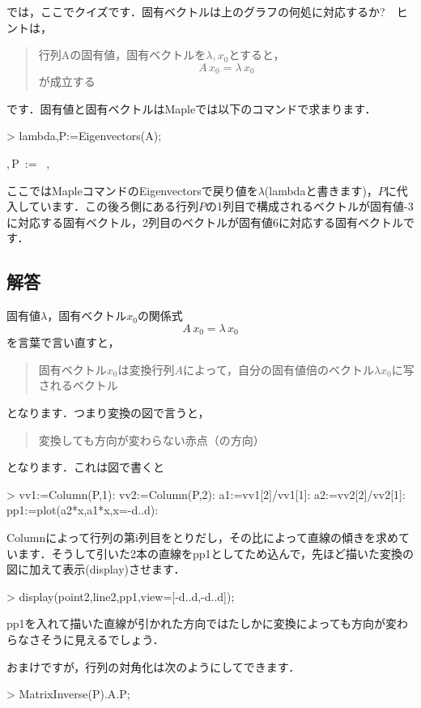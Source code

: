では，ここでクイズです．固有ベクトルは上のグラフの何処に対応するか?　ヒントは，
\begin{quotation}
行列Aの固有値，固有ベクトルを$\lambda, x_0$とすると，
\begin{equation*}
A \,x_0 = \lambda \, x_0
\end{equation*}
が成立する
\end{quotation}
です．固有値と固有ベクトルはMapleでは以下のコマンドで求まります．
\begin{MapleInput}
> lambda,P:=Eigenvectors(A);
\end{MapleInput}
\begin{MapleOutput}
\lambda,\,P\, := \, \left[ \begin {array}{c} -3\\6\end {array} \right] ,\, \left[ \begin {array}{cc} -1&5/4\\1&1\end {array} \right]
\end{MapleOutput}
ここではMapleコマンドのEigenvectorsで戻り値を$\lambda$(lambdaと書きます)，$P$に代入しています．この後ろ側にある行列$P$の1列目で構成されるベクトルが固有値-3に対応する固有ベクトル，2列目のベクトルが固有値6に対応する固有ベクトルです．

\subsection{解答}
固有値$\lambda$，固有ベクトル$x_0$の関係式
\begin{equation*}
A \,x_0 = \lambda \, x_0
\end{equation*}
を言葉で言い直すと，
\begin{quote}
固有ベクトル$x_0$は変換行列$A$によって，自分の固有値倍のベクトル$\lambda x_0$に写されるベクトル
\end{quote}
となります．つまり変換の図で言うと，
\begin{quote}
変換しても方向が変わらない赤点（の方向）
\end{quote}
となります．これは図で書くと
\begin{MapleInput}
> vv1:=Column(P,1): vv2:=Column(P,2): 
  a1:=vv1[2]/vv1[1]: a2:=vv2[2]/vv2[1]:
  pp1:=plot({a2*x,a1*x},x=-d..d):
\end{MapleInput}
Columnによって行列の第i列目をとりだし，その比によって直線の傾きを求めています．そうして引いた2本の直線をpp1としてため込んで，先ほど描いた変換の図に加えて表示(display)させます．
\begin{MapleInput}
> display(point2,line2,pp1,view=[-d..d,-d..d]);
\end{MapleInput}
pp1を入れて描いた直線が引かれた方向ではたしかに変換によっても方向が変わらなさそうに見えるでしょう．

おまけですが，行列の対角化は次のようにしてできます．
\begin{MapleInput}
> MatrixInverse(P).A.P;
\end{MapleInput}
\begin{MapleOutput}
\left[ \begin {array}{cc} -3&0\\ 0&6\end {array} \right]
\end{MapleOutput}